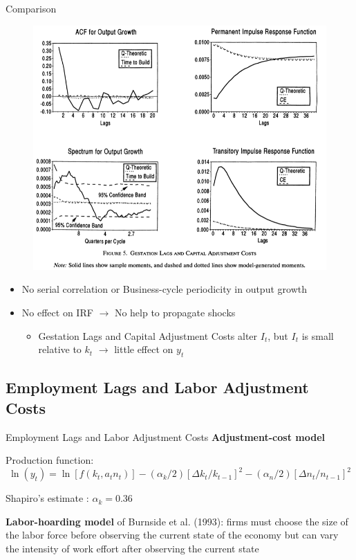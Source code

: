 \documentclass[10pt]{beamer}
\begin{document}
\begin{frame}{Comparison}
\begin{figure}
    \centering
  \includegraphics[width=0.6\linewidth]{Capital adj cost.png}
\end{figure}
\begin{itemize}
    \item No serial correlation or Business-cycle periodicity in output growth
    \item No effect on IRF $\rightarrow$ No help to propagate shocks
    \begin{itemize}
        \item Gestation Lags and Capital Adjustment Costs alter $I_t$, but $I_t$ is small relative to $k_t$ $\rightarrow$ little effect on $y_t$
    \end{itemize}
\end{itemize}
    
\end{frame}

\subsection{Employment Lags and Labor Adjustment Costs}
\begin{frame}{Employment Lags and Labor Adjustment Costs}
\textbf{Adjustment-cost model}

Production function:
$$
\ln \left(y_t\right)= \ln \left[f\left(k_t, a_t n_t\right)\right] -\left(\alpha_{k} / 2\right)\left[\Delta k_t / k_{t-1}\right]^2 -\left(\alpha_n / 2\right)\left[\Delta n_t / n_{t-1}\right]^2
$$

Shapiro's estimate : $\alpha_{k} = 0.36$


\textbf{Labor-hoarding model} of Burnside et al. (1993): firms must choose the size of the labor force before observing the current state of the economy but can vary the intensity of work effort after observing the current state

\end{frame}
\end{document}
